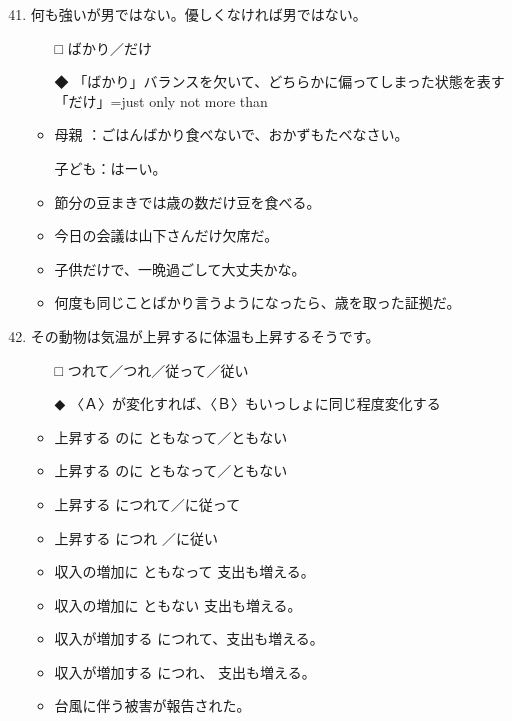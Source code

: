 \documentclass[
uplatex,
b5paper,
10pt,
dvipdfmx
]{jsbook}
\begin{document}
\begin{enumerate}
\setcounter{enumi}{40}

\item 何も強い\underline{\hspace{3zw}}が男ではない。優しくなければ男ではない。
\begin{itemize}
\item[□] ばかり／だけ
\item[◆] 「ばかり」バランスを欠いて、どちらかに偏ってしまった状態を表す
	  「だけ」=just only not more than
\end{itemize}
\begin{itemize}
 \item 母親 ：ごはんばかり食べないで、おかずもたべなさい。

       子ども：はーい。

 \item 節分の豆まきでは歳の数だけ豆を食べる。
 \item 今日の会議は山下さんだけ欠席だ。
 \item 子供だけで、一晩過ごして大丈夫かな。
 \item 何度も同じことばかり言うようになったら、歳を取った証拠だ。    
\end{itemize}

\item その動物は気温が上昇するに\underline{\hspace{3zw}}体温も上昇するそうです。
\begin{itemize}
\item[□] つれて／つれ／従って／従い
\item[◆] 〈Ａ〉が変化すれば、〈Ｂ〉もいっしょに同じ程度変化する
\end{itemize}
\begin{itemize}
\item 上昇する のに ともなって／ともない
\item 上昇する のに ともなって／ともない
\item 上昇する    につれて／に従って
\item 上昇する    につれ ／に従い
\end{itemize}
\begin{itemize}
 \item 収入の増加に ともなって 支出も増える。
 \item 収入の増加に ともない  支出も増える。
 \item 収入が増加する につれて、支出も増える。
 \item 収入が増加する につれ、 支出も増える。
 \item 台風に伴う被害が報告された。
\end{itemize}


\end{enumerate}
\end{document}
